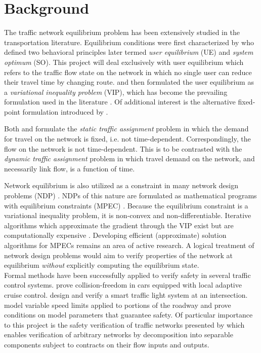 \section{Background}

The traffic network equilibrium problem has been extensively studied in the transportation literature.
Equilibrium conditions were first characterized by \citet{wardrop1952some} who defined two behavioral principles later termed \textit{user equilibrium} (UE) and \textit{system optimum} (SO).
This project will deal exclusively with user equilibrium which refers to the traffic flow state on the network in which no single user can reduce their travel time by changing route.
\citet{smith1979existence} and \citet{dafermos1980traffic} then formulated the user equilibrium as a \textit{variational inequality problem} (VIP), which has become the prevailing formulation used in the literature \citep{nagurney2009netecon}.
Of additional interest is the alternative fixed-point formulation introduced by \citet{smith1979existence}.

Both \citet{smith1979existence} and \citet{dafermos1980traffic} formulate the \textit{static traffic assignment} problem in which the demand for travel on the network is fixed, i.e. not time-dependent.
Correspondingly, the flow on the network is not time-dependent.
This is to be contrasted with the \textit{dynamic traffic assignment} problem in which travel demand on the network, and necessarily link flow, is a function of time. 

Network equilibrium is also utilized as a constraint in many network design problems (NDP) \citep{sheffi1983optimal}.
NDPs of this nature are formulated as mathematical programs with equilibrium  constraints (MPEC) \citep{luo1996mathematical}.
Because the equilibrium constraint is a variational inequality problem, it is non-convex and non-differentiable.
Iterative algorithms which approximate the gradient through the VIP exist but are computationally expensive \citep{josefsson2007sensitivity}.
Developing efficient (approximate) solution algorithms for MPECs remains an area of active research.
A logical treatment of network design problems would aim to verify properties of the network at equilibrium \textit{without} explicitly computing the equilibrium state.\\

Formal methods have been successfully applied to verify safety in several traffic control systems.
\citet{DBLP:conf/fm/LoosPN11} prove collision-freedom in cars equipped with local adaptive cruise control.
\citet{DBLP:conf/itsc/LoosP11} design and verify a smart traffic light system at an intersection.
\citet{DBLP:conf/iccps/MitschLP12} model variable speed limits applied to portions of the roadway and prove conditions on model parameters that guarantee safety.
Of particular importance to this project is the safety verification of traffic networks presented by \citet{DBLP:conf/itsc/MullerMP15} which enables verification of arbitrary networks by decomposition into separable components subject to contracts on their flow inputs and outputs. 


